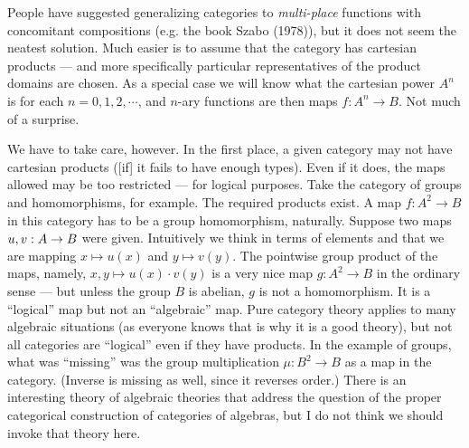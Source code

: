 People have suggested generalizing categories to {\it multi-place} functions with
concomitant compositions (e.g. the book Szabo (1978)), but it does not seem the neatest
solution. Much easier is to assume that the category has cartesian products --- and more
specifically particular representatives of the product domains are chosen. As a special
case we will know what the cartesian power $A^n$ is for each $n=0,1,2,\cdots$, and $n$-ary
functions are then maps $f: A^n\to B$. Not much of a surprise.

We have to take care, however. In the first place, a given category may not have cartesian
products ([if] it fails to have enough types). Even if it does, the maps allowed may be too
restricted --- for logical purposes. Take the category of groups and homomorphisms, for
example. The required products exist. A map $f : A^2 \to B$ in this category has to be a
group homomorphism, naturally. Suppose two maps $u,v: A \rightarrow B$ were given. Intuitively we
think in terms of elements and that we are mapping $x \mapsto u(x)$ and $y \mapsto v(y)$.
The pointwise group product of the maps, namely, $x,y \mapsto  u(x) \cdot v(y)$ is a very
nice map $g : A^2 \to B$ in the ordinary sense --- but unless the group $B$ is abelian,
$g$ is not a homomorphism. %
It is a ``logical'' map but not an ``algebraic'' map. Pure
category theory applies to many algebraic situations (as everyone knows that is why it is
a good theory), but not all categories are ``logical'' even if they have products. In the
example of groups, what was ``missing'' was the group multiplication $\mu: B^2 \to B$ as a
map in the category. (Inverse is missing as well, since it reverses order.) There is an
interesting theory of algebraic theories that address the question of the proper
categorical construction of categories of algebras, but I do not think we should invoke
that theory here.

